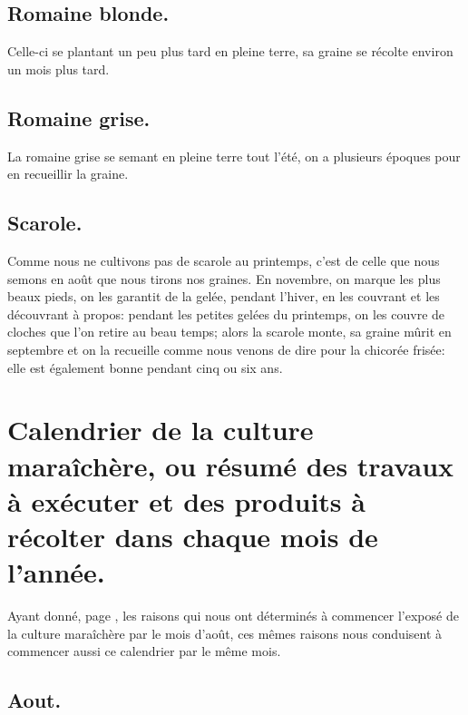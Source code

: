 \documentclass[10pt,a4paper]{book}
\begin{document}
\section{Romaine blonde.}

Celle-ci se plantant un peu plus tard en pleine terre, sa graine se récolte environ un mois plus tard.

\section{Romaine grise.}

La romaine grise se semant en pleine terre tout l'été, on a plusieurs époques pour en recueillir la graine.

\section{Scarole.}

Comme nous ne cultivons pas de scarole au printemps, c'est de celle que nous semons en août que nous tirons nos graines. En novembre, on marque les plus beaux pieds, on les garantit de la gelée, pendant l'hiver, en les couvrant et les découvrant à propos: pendant les petites gelées du printemps, on les couvre de cloches que l'on retire au beau temps; alors la scarole monte, sa graine mûrit en septembre et on la recueille comme nous venons de dire pour la chicorée frisée: elle est également bonne pendant cinq ou six ans.

\chapter{Calendrier de la culture maraîchère, ou résumé des travaux à exécuter et des produits à récolter dans chaque mois de l’année.}

{\small Ayant donné, page \pageref{moisdaout}, les raisons qui nous ont déterminés à commencer l'exposé de la culture maraîchère par le mois d'août, ces mêmes raisons nous conduisent à commencer aussi ce calendrier par le même mois.}

\section{Aout.}
\end{document}
